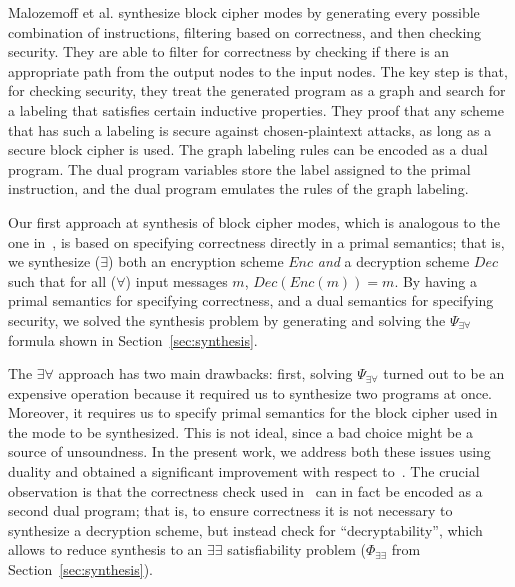 \documentclass[preprint]{sig-alternate-05-2015}
\begin{document}
Malozemoff et al. synthesize block cipher modes by generating every possible
combination of instructions, filtering based on correctness, and then checking
security. They are able to filter for correctness by checking if there is an
appropriate path from the output nodes to the input nodes. 
The key step is that, for checking security, they 
treat the generated program as a graph and search for a labeling that
satisfies certain inductive properties. They proof that any
scheme that has such a labeling is secure against chosen-plaintext attacks,
as long as a secure block cipher is used. 
The graph labeling rules can be encoded as a dual program. 
The dual program variables store the label assigned to the primal instruction,
and the dual program emulates the rules of the graph labeling.

Our first approach at synthesis of block cipher modes, which is analogous to the 
one in~\cite{TGD15:CADE}, is based on 
specifying correctness 
directly in a primal semantics; that is, 
we synthesize ($\exists$) both an encryption scheme $Enc$ {\em{and}} a decryption
scheme $Dec$ such that for all ($\forall$) input messages $m$,
$Dec( Enc( m ) ) = m$. 
By having a primal semantics for specifying correctness, and a dual semantics
for specifying security, we solved the synthesis problem by generating
and solving the $\Psi_{\exists\forall}$ formula shown in Section~\ref{sec:synthesis}.

The $\exists\forall$ approach has two main drawbacks: first, solving 
$\Psi_{\exists\forall}$ turned out to be an expensive operation because 
it required us to synthesize two programs at once. Moreover, 
it requires us to specify primal semantics for the block cipher
used in the mode to be synthesized. This is not ideal, since
a bad choice might be a source of unsoundness.
In the present work, we address both these issues using duality and 
obtained a significant improvement with respect to~\cite{TGD15:CADE}.
The crucial observation is that the
correctness check used 
in~\cite{DBLP:conf/csfw/MalozemoffKG14} can in fact be %
encoded as a second dual program; that is,
to ensure correctness 
it is not necessary to synthesize a decryption scheme, but instead check for ``decryptability'',
which 
allows to reduce synthesis to an $\exists\exists$ satisfiability problem ($\Phi_{\exists\exists}$
from Section~\ref{sec:synthesis}).
\end{document}
